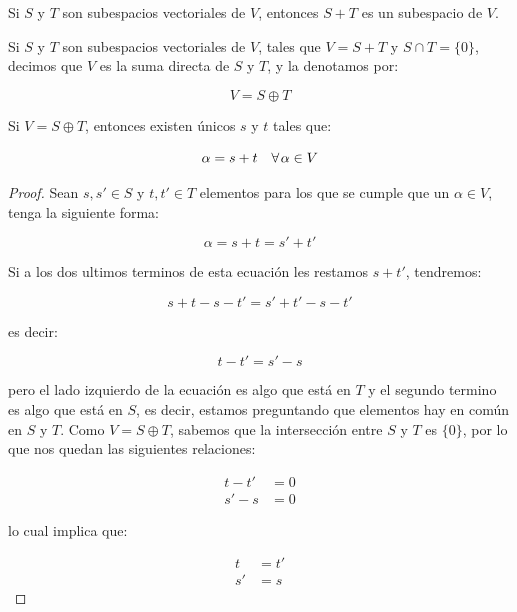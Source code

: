 		\begin{proposicion}
			Si $S$ y $T$ son subespacios vectoriales de $V$, entonces $S + T$ es un subespacio de $V$.
		\end{proposicion}

		\begin{definicion}
			Si $S$ y $T$ son subespacios vectoriales de $V$, tales que $V = S + T$ y $S \cap T = \{0\}$, decimos que $V$ es la suma directa de $S$ y $T$, y la denotamos por:

			\begin{equation}
				V = S \oplus T 
			\end{equation}
		\end{definicion}

		\begin{proposicion}
			Si $V = S \oplus T$, entonces existen únicos $s$ y $t$ tales que:

			\begin{equation}
				\alpha = s + t \quad \forall \mkern2mu \alpha \in V
			\end{equation}
		\end{proposicion}

		\begin{proof}
			Sean $s, s' \in S$ y $t, t' \in T$ elementos para los que se cumple que un $\alpha \in V$, tenga la siguiente forma:

			\begin{equation*}
				\alpha = s + t = s' + t'
			\end{equation*}

			Si a los dos ultimos terminos de esta ecuación les restamos $s + t'$, tendremos:

			\begin{equation*}
				s + t - s - t' = s' + t' - s - t'
			\end{equation*}

			es decir:

			\begin{equation*}
				t - t' = s' - s
			\end{equation*}

			pero el lado izquierdo de la ecuación es algo que está en $T$ y el segundo termino es algo que está en $S$, es decir, estamos preguntando que elementos hay en común en $S$ y $T$.
			Como $V = S \oplus T$, sabemos que la intersección entre $S$ y $T$ es $\{0\}$, por lo que nos quedan las siguientes relaciones:

			\begin{align*}
				t - t' &= 0 \\
				s' - s &= 0
			\end{align*}

			lo cual implica que:

			\begin{align*}
				t &= t' \\
				s' &= s
			\end{align*}
		\end{proof}

